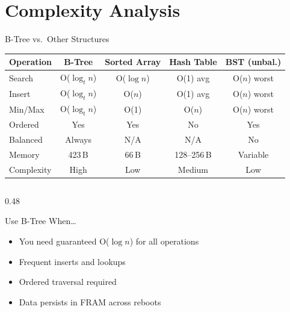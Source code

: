 \documentclass[aspectratio=169, 10pt]{beamer}
\begin{document}
\section{Complexity Analysis}

\begin{frame}{B-Tree vs.\ Other Structures}
\begin{table}
\centering
\small
\begin{tabular}{@{}lcccc@{}}
\toprule
\textbf{Operation} & \textbf{B-Tree} & \textbf{Sorted Array} & \textbf{Hash Table} & \textbf{BST (unbal.)} \\
\midrule
Search      & O($\log_t n$) & O($\log n$)  & O(1) avg    & O($n$) worst \\
Insert      & O($\log_t n$) & O($n$)       & O(1) avg    & O($n$) worst \\
Min/Max     & O($\log_t n$) & O(1)         & O($n$)      & O($n$) worst \\
Ordered     & Yes           & Yes          & No          & Yes \\
Balanced    & Always        & N/A          & N/A         & No \\
Memory      & 423\,B        & 66\,B        & 128--256\,B & Variable \\
Complexity  & High          & Low          & Medium      & Low \\
\bottomrule
\end{tabular}
\end{table}

\vspace{0.5em}
\begin{columns}[T]
\begin{column}{0.48\textwidth}
\begin{block}{Use B-Tree When\ldots}
\begin{itemize}
  \item You need guaranteed O($\log n$) for all operations
  \item Frequent inserts and lookups
  \item Ordered traversal required
  \item Data persists in FRAM across reboots
\end{itemize}
\end{block}
\end{column}


\end{columns}
\end{frame}
\end{document}
